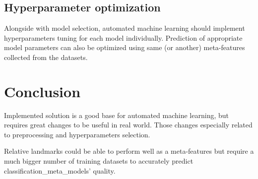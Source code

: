 \documentclass[hidelinks, english]{mvi-report}
\begin{document}
\subsection{Hyperparameter optimization}
Alongside with model selection, automated machine learning should implement hyperparameters tuning for each model
individually. Prediction of appropriate model parameters can also be optimized using same (or another) meta-features
collected from the datasets.

\section{Conclusion}

Implemented solution is a good base for automated machine learning, but requires great changes to be useful in real
world. Those changes especially related to preprocessing and hyperparameters selection.

Relative landmarks could be able to perform well as a meta-features but require a much bigger number of training
datasets to accurately predict classification_meta_models' quality.



\end{document}
